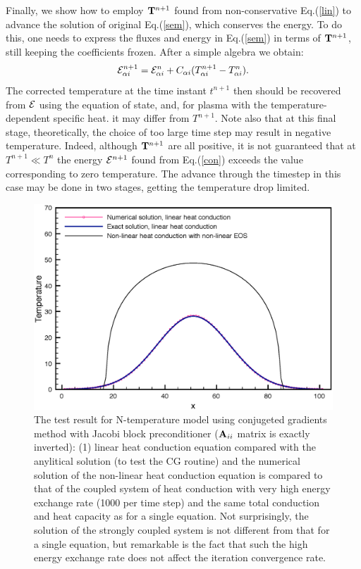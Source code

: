 \documentclass[12pt]{revtex4}
\begin{document}
Finally, we show how to employ ${\bf T}^{n+1}$ found from non-conservative Eq.(\ref{lin}) to advance the solution of original 
Eq.(\ref{sem}), which conserves the energy. To do this, one needs to express the fluxes and energy in Eq.(\ref{sem}) in terms of
${\bf T}^{n+1}$, still keeping the coefficients frozen. After a simple algebra we obtain:
\begin{equation}\label{con}
{\cal E}_{\alpha i}^{n+1} = {\cal E}_{\alpha i}^{n}+C_{\alpha i}(T^{n+1}_{\alpha i}-T^n_{\alpha i}).
\end{equation} 
The corrected temperature at the time instant $t^{n+1}$ then should be recovered from ${\cal E}$ using the equation of state, and,
for plasma with the temperature-dependent specific heat. it may differ from $T^{n+1}$.  
Note also that at this final stage, theoretically, the choice of too large time step may result in negative temperature. Indeed, although ${\bf T}^{n+1}$ 
are all positive, it is not guaranteed that at $T^{n+1}\ll T^{n}$ the energy ${\cal E}^{n+1}$ found from Eq.(\ref{con}) exceeds the value corresponding to
zero temperature. The advance through the timestep in this case may be done in two stages, getting the temperature drop limited.
\begin{figure}
\includegraphics[scale=0.50]{Fig1.eps}
\caption{The test result for N-temperature model using conjugeted gradients method with Jacobi block preconditioner (${\bf A}_{ii}$ matrix is 
exactly inverted): (1) linear heat conduction equation compared with the anylitical solution  (to test the CG routine) and the numerical solution 
of the non-linear heat conduction equation is compared to that of the coupled system of heat conduction with very high energy exchange rate 
(1000 per time step) and the same total conduction and heat capacity as for a single equation. Not surprisingly, the solution of the strongly coupled 
system is not different from that for a single equation, but remarkable is the fact that such the high energy exchange rate does not affect
the iteration convergence rate.
}
\label{fig_1}
\end{figure}  
\end{document}
